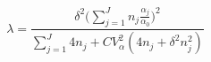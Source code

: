 \begin{equation}
\label{weightedlambda}
\lambda = \frac{\delta^2 \Big(\sum\limits_{j=1}^J n_j \frac{\alpha_j}{\alpha_0}\Big)^2 }{\sum\limits_{j=1}^J 4n_j + CV_{\alpha}^2(4n_j + \delta^2n_j^2)}
\end{equation}